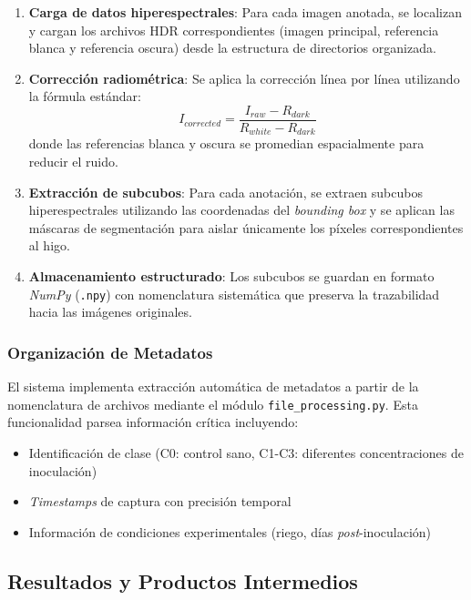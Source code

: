 \begin{enumerate}
\item \textbf{Carga de datos hiperespectrales}: Para cada imagen anotada, se localizan y cargan los archivos HDR correspondientes (imagen principal, referencia blanca y referencia oscura) desde la estructura de directorios organizada.

\item \textbf{Corrección radiométrica}: Se aplica la corrección línea por línea utilizando la fórmula estándar:
\begin{equation}
I_{corrected} = \frac{I_{raw} - R_{dark}}{R_{white} - R_{dark}}
\end{equation}
donde las referencias blanca y oscura se promedian espacialmente para reducir el ruido.

\item \textbf{Extracción de subcubos}: Para cada anotación, se extraen subcubos hiperespectrales utilizando las coordenadas del \emph{bounding box} y se aplican las máscaras de segmentación para aislar únicamente los píxeles correspondientes al higo.

\item \textbf{Almacenamiento estructurado}: Los subcubos se guardan en formato \emph{NumPy} (\texttt{.npy}) con nomenclatura sistemática que preserva la trazabilidad hacia las imágenes originales.
\end{enumerate}

\subsubsection{Organización de Metadatos}

El sistema implementa extracción automática de metadatos a partir de la nomenclatura de archivos mediante el módulo \texttt{file\_processing.py}. Esta funcionalidad parsea información crítica incluyendo:

\begin{itemize}
\item Identificación de clase (C0: control sano, C1-C3: diferentes concentraciones de inoculación)
\item \emph{Timestamps} de captura con precisión temporal
\item Información de condiciones experimentales (riego, días \emph{post}-inoculación)
\end{itemize}

\subsection{Resultados y Productos Intermedios}


